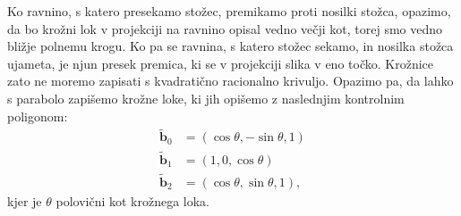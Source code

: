 \documentclass[a4paper,11pt]{article}
\theoremstyle{definition}
\theoremstyle{plain}
\begin{document}
\noindent
Ko ravnino, s katero presekamo stožec, premikamo proti nosilki stožca, opazimo, da bo krožni lok v projekciji na ravnino opisal vedno večji kot, torej smo vedno bližje polnemu krogu. 
Ko pa se ravnina, s katero stožec sekamo, in nosilka stožca ujameta, je njun presek premica, ki se v projekciji slika v eno točko. 
Krožnice zato ne moremo zapisati s kvadratično racionalno krivuljo. 
Opazimo pa, da lahko s parabolo zapišemo krožne loke, ki jih opišemo z naslednjim kontrolnim poligonom:
\begin{align*}
\boldsymbol{\tilde{b}}_0 &= (\cos{\theta}, -\sin{\theta}, 1)\\
\boldsymbol{\tilde{b}}_1 &= (1, 0, \cos{\theta})\\
\boldsymbol{\tilde{b}}_2 &= (\cos \theta, \sin\theta, 1),
\end{align*}
kjer je $\theta$ polovični kot krožnega loka. 

\end{document}
